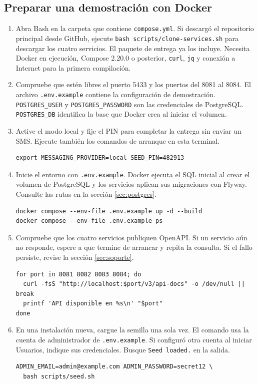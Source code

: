 \documentclass[11pt,a4paper]{article}
\newcommand{\code}[1]{\nolinkurl{#1}}
\begin{document}
\subsection{Preparar una demostración con Docker}\label{sec:docker}
\begin{enumerate}
\item Abra Bash en la carpeta que contiene \code{compose.yml}. Si descargó el repositorio principal desde GitHub, ejecute \code{bash scripts/clone-services.sh} para descargar los cuatro servicios. El paquete de entrega ya los incluye. Necesita Docker en ejecución, Compose 2.20.0 o posterior, \code{curl}, \code{jq} y conexión a Internet para la primera compilación.
\item Compruebe que estén libres el puerto 5433 y los puertos del 8081 al 8084. El archivo \code{.env.example} contiene la configuración de demostración. \code{POSTGRES_USER} y \code{POSTGRES_PASSWORD} son las credenciales de PostgreSQL. \code{POSTGRES_DB} identifica la base que Docker crea al iniciar el volumen.
\item Active el modo local y fije el PIN para completar la entrega sin enviar un SMS. Ejecute también los comandos de arranque en esta terminal.
\begin{lstlisting}
export MESSAGING_PROVIDER=local SEED_PIN=482913
\end{lstlisting}
\item Inicie el entorno con \code{.env.example}. Docker ejecuta el SQL inicial al crear el volumen de PostgreSQL y los servicios aplican sus migraciones con Flyway. Consulte las rutas en la sección \ref{sec:postgres}.
\begin{lstlisting}
docker compose --env-file .env.example up -d --build
docker compose --env-file .env.example ps
\end{lstlisting}
\item Compruebe que los cuatro servicios publiquen OpenAPI. Si un servicio aún no responde, espere a que termine de arrancar y repita la consulta. Si el fallo persiste, revise la sección \ref{sec:soporte}.
\begin{lstlisting}
for port in 8081 8082 8083 8084; do
  curl -fsS "http://localhost:$port/v3/api-docs" -o /dev/null || break
  printf 'API disponible en %s\n' "$port"
done
\end{lstlisting}
\item En una instalación nueva, cargue la semilla una sola vez. El comando usa la cuenta de administrador de \code{.env.example}. Si configuró otra cuenta al iniciar Usuarios, indique sus credenciales. Busque \code{Seed loaded.} en la salida.
\begin{lstlisting}
ADMIN_EMAIL=admin@example.com ADMIN_PASSWORD=secret12 \
  bash scripts/seed.sh
\end{lstlisting}
\end{enumerate}
\end{document}
